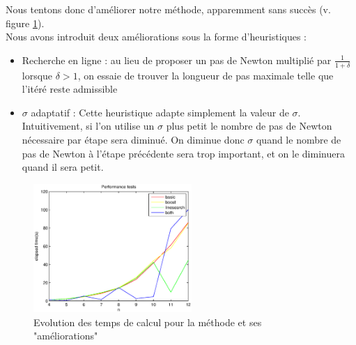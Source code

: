 Nous tentons donc d'améliorer notre méthode, apparemment sans succès (v. figure \ref{fig:speedimp}).\\
Nous avons introduit deux améliorations sous la forme d'heuristiques : 
\begin{itemize}
\item Recherche en ligne : au lieu de proposer un pas de Newton multiplié par $\frac{1}{1+\delta}$ lorsque $\delta>1$, on essaie de trouver la longueur de pas maximale telle que l'itéré reste admissible

\item $\sigma$ adaptatif : Cette heuristique adapte simplement la valeur de $\sigma$. Intuitivement, si l'on utilise un $\sigma$ plus petit le nombre de pas de Newton nécessaire par étape sera diminué. On diminue donc $\sigma$ quand le nombre de pas de Newton à l'étape précédente sera trop important, et on le diminuera quand il sera petit.

\end{itemize}
\begin{figure}[!h]
\centering
\includegraphics[width=6cm]{images/speedimp.eps}
\caption{Evolution des temps de calcul pour la méthode et ses "améliorations"\label{fig:speedimp}}
\end{figure}

